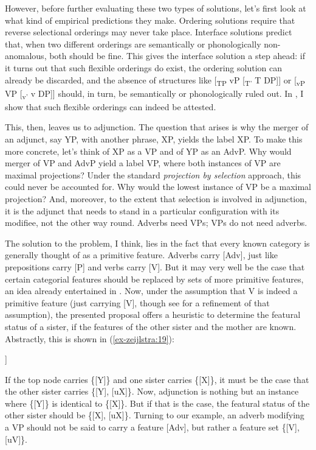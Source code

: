 \documentclass[output=paper
,modfonts
,nonflat]{langsci/langscibook}
\begin{document}
However, before further evaluating these two types of solutions, let’s first look at what kind of empirical predictions they make. Ordering solutions require that reverse selectional orderings may never take place. Interface solutions predict that, when two different orderings are semantically or phonologically non-anomalous, both should be fine. This gives the interface solution a step ahead: if it turns out that such flexible orderings do exist, the ordering solution can already be discarded, and the absence of structures like [\textsubscript{TP} vP [\textsubscript{T’} T DP]] or [\textsubscript{vP} VP [\textsubscript{v’} v DP]] should, in turn, be semantically or phonologically ruled out. In , I show that such flexible orderings can indeed be attested.

This, then, leaves us to adjunction. The question that arises is why the merger of an adjunct, say YP, with another phrase, XP, yields the label XP. To make this more concrete, let’s think of XP as a VP and of YP as an AdvP. Why would merger of VP and AdvP yield a label VP, where both instances of VP are maximal projections? Under the standard \textit{projection by selection} approach, this could never be accounted for. Why would the lowest instance of VP be a maximal projection? And, moreover, to the extent that selection is involved in adjunction, it is the adjunct that needs to stand in a particular configuration with its modifiee, not the other way round. Adverbs need VPs; VPs do not need adverbs. 

The solution to the problem, I think, lies in the fact that every known category is generally thought of as a primitive feature. Adverbs carry [Adv], just like prepositions carry [P] and verbs carry [V]. But it may very well be the case that certain categorial features should be replaced by sets of more primitive features, an idea already entertained in \citet{Chomsky1970, Chomsky1981}. Now, under the assumption that V is indeed a primitive feature (just carrying [V], though see  for a refinement of that assumption), the presented proposal offers a heuristic to determine the featural status of a sister, if the features of the other sister and the mother are known. Abstractly, this is shown in (\ref{ex-zeijlstra:19}): 

\begin{exe}
		\ex\label{ex-zeijlstra:19}
			\begin{forest}	
				[\{{[}Y{]}\}
				[\{{[}X{]}\}]
				[\{{[}Y{]}{,} {[}uX{]}\}] ]
		\end{forest}
	\end{exe}
\noindent If the top node carries \{[Y]\} and one sister carries \{[X]\}, it must be the case that the other sister carries \{[Y], [uX]\}. Now, adjunction is nothing but an instance where \{[Y]\} is identical to \{[X]\}. But if that is the case, the featural status of the other sister should be \{[X], [uX]\}. 
Turning to our example, an adverb modifying a VP should not be said to carry a feature [Adv], but rather a feature set \{[V], [uV]\}.
\end{document}
